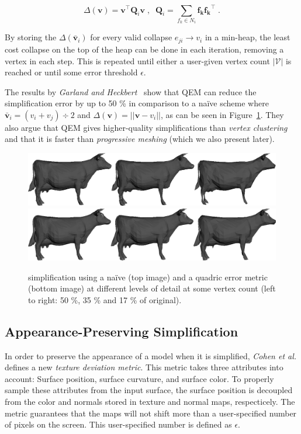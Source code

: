 \begin{equation}\Delta(\mathbf{v}) = \mathbf{v}^\intercal \mathbf{Q}_i  \mathbf{v} \;,\;\; \mathbf{Q}_i = \sum_{f_k \in N_i}  \mathbf{f_k} \mathbf{f_k}^\intercal \; .\end{equation}

By storing the \(\Delta(\mathbf{\bar{v}}_i)\) for every valid collapse \(e_{ji} \rightarrow v_i\) in a min-heap, the least cost collapse on the top of the heap can be done in each iteration, removing a vertex in each step. This is repeated until either a user-given vertex count \(|\mathcal{V}|\) is reached or until some error threshold \(\epsilon\).

The results by \emph{Garland and Heckbert}~\cite{garland1998simplifying} show that QEM can reduce the simplification error by up to 50 \% in comparison to a na\"ive scheme where \(\mathbf{\bar{v}}_i = (v_i + v_j) \div 2\) and \(\Delta(\mathbf{v}) = ||\mathbf{v} - v_i||\), as can be seen in Figure~\ref{fig:naive_vs_quadric}. They also argue that QEM gives higher-quality simplifications than \emph{vertex clustering} and that it is faster than \emph{progressive meshing} (which we also present later).

\begin{figure}[h]
    \centering
    \includegraphics[width=\textwidth]{figures/naive_simplification.png}
    \includegraphics[width=\textwidth]{figures/quadric_simplification.png}
    \caption{simplification using a na\"ive (top image) and a quadric error metric (bottom image) at different levels of detail at some vertex count (left to right: 50 \%, 35 \% and 17 \% of original).}
    \label{fig:naive_vs_quadric}
\end{figure}

\subsection{Appearance-Preserving Simplification} \label{sec:appearance-preserving_simplification}
In order to preserve the appearance of a model when it is simplified, \emph{Cohen et al.} \cite{cohen1998appearance} defines a new \emph{texture deviation metric}. This metric takes three attributes into account: Surface position, surface curvature, and surface color. To properly sample these attributes from the input surface, the surface position is decoupled from the color and normals stored in texture and normal maps, respecticely. The metric guarantees that the maps will not shift more than a user-specified number of pixels on the screen. This user-specified number is defined as $\epsilon$.

